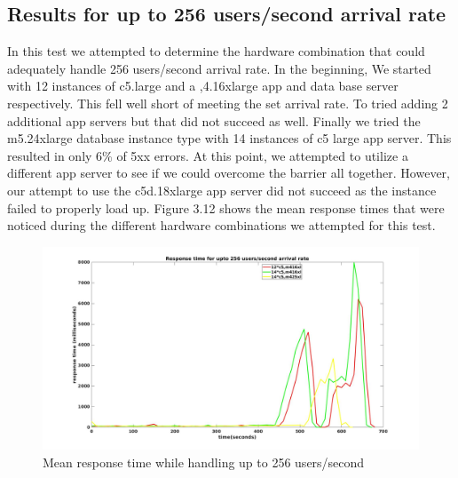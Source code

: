\subsection{Results for up to 256 users/second arrival rate}
In this test we attempted to determine the hardware combination that could adequately handle 256 users/second arrival rate. In the beginning, We started with 12 instances of c5.large and a ,4.16xlarge app and data base server respectively. This fell well short of meeting the set arrival rate. To tried adding 2 additional app servers but that did not succeed as well. Finally we tried the m5.24xlarge database instance type with 14 instances of c5 large app server. This resulted in only $6\%$ of 5xx errors. At this point, we attempted to utilize a different app server to see if we could overcome the barrier all together. However, our attempt to use the c5d.18xlarge app server did not succeed as the instance failed to properly load up. Figure 3.12 shows the mean response times that were noticed during the different hardware combinations we attempted for this test. 

\begin{figure}[h]
	\centering
	\includegraphics[width=1\textwidth]{images/scale256.jpg}
	\caption{Mean response time while handling up to 256 users/second}\label{fig:sqlopt}
\end{figure}





